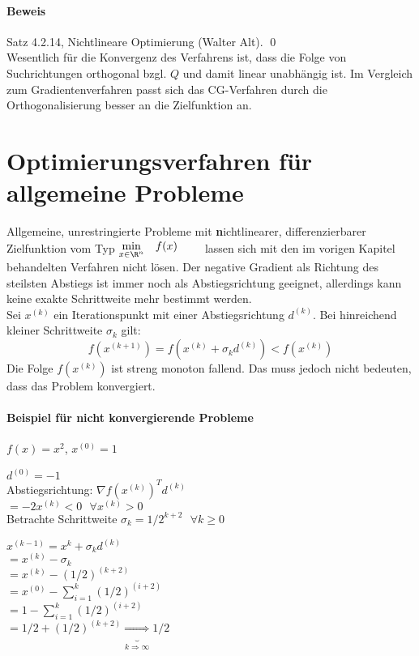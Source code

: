 \paragraph{Beweis}
Satz 4.2.14, Nichtlineare Optimierung (Walter Alt). \qed \\
Wesentlich für die Konvergenz des Verfahrens ist, dass die Folge von
Suchrichtungen orthogonal bzgl. $Q$ und damit linear unabhängig ist. Im
Vergleich zum Gradientenverfahren passt sich das CG-Verfahren durch
die Orthogonalisierung besser an die Zielfunktion an.
\section{Optimierungsverfahren für allgemeine Probleme}

Allgemeine, unrestringierte Probleme mit \textbf nichtlinearer, differenzierbarer Zielfunktion vom Typ
$
			\begin{aligned}
				\min_{x\in\R^n}
				& & & f(x) & & &
			\end{aligned} $ lassen sich mit den im vorigen Kapitel behandelten Verfahren nicht lösen. Der negative Gradient als Richtung des steilsten Abstiegs ist immer noch als Abstiegsrichtung geeignet, allerdings kann keine exakte Schrittweite mehr bestimmt werden.\\
Sei $x^{(k)}$ ein Iterationspunkt mit einer Abstiegsrichtung $d^{(k)}$. Bei hinreichend kleiner Schrittweite $\sigma_k$ gilt:
\begin{equation}
	f(x^{(k+1)}) = f(x^{(k)} + \sigma_kd^{(k)}) < f(x^{(k)})
\end{equation}
Die Folge ${f(x^{(k)})}$ ist streng monoton fallend. Das muss jedoch nicht bedeuten, dass das Problem konvergiert.
\paragraph{Beispiel für nicht konvergierende Probleme}

$f(x)= x^2$, $x^{(0)} = 1$


$d^{(0)} = -1$ \\
Abstiegsrichtung: $\nabla f(x^{(k)})^T d^{(k)}$\\
\noindent\hspace*{32mm}%
 $=  -2x^{(k)} < 0 \, \, \, \, \forall x^{(k)} > 0$\\
Betrachte Schrittweite $\sigma_k = 1/2^{k+2} \, \, \, \, \forall k \geq 0$


$x^{(k-1)} = x^k + \sigma_k d^{(k)}$ \\
$= x^{(k)} - \sigma_k$ \\
$= x^{(k)} - (1/2)^{(k+2)}$ \\
$= x^{(0)} - \sum\limits_{i=1}^k (1/2)^{(i+2)}$ \\
$= 1 - \sum\limits_{i=1}^k (1/2)^{(i+2)}$ \\
$= 1/2 + (1/2)^{(k+2)}  \underbrace{\Rightarrow}_{k\Rightarrow \infty} 1/2$



